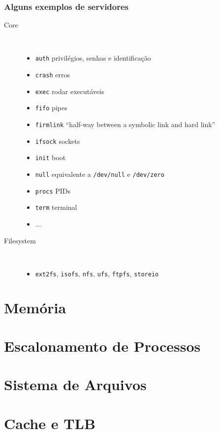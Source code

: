 \documentclass[10pt]{beamer}
\theoremstyle{plain}
\newcommand{\code}[1]{\lstinline[mathescape=true]{#1}}
\begin{document}
\begin{frame}
  \frametitle{Alguns exemplos de servidores}
  \begin{description}
    \item[Core]~\\
      \begin{itemize}
        \item \code{auth} privilégios, senhas e identificação
        \item \code{crash} erros
        \item \code{exec} rodar executáveis
        \item \code{fifo} pipes
        \item \code{firmlink} ``half-way between a symbolic link and hard link''
        \item \code{ifsock} sockets
        \item \code{init} boot
        \item \code{null} equivalente a \code{/dev/null} e \code{/dev/zero}
        \item \code{procs} PIDs
        \item \code{term} terminal
        \item $\ldots$
      \end{itemize}
    \item[Filesystem]~\\
      \begin{itemize}
        \item \code{ext2fs}, \code{isofs}, \code{nfs}, \code{ufs}, \code{ftpfs}, \code{storeio}
      \end{itemize}
  \end{description}
\end{frame}

\section{Memória}

\section{Escalonamento de Processos}

\section{Sistema de Arquivos}

\section{Cache e TLB}
\end{document}
